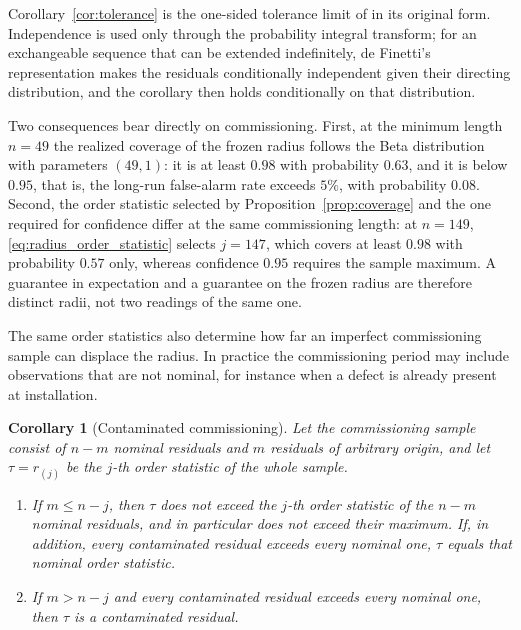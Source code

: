 \documentclass[a4paper]{cas-sc}
\newenvironment{reviewadded}{\par\color{blue}}{\par}
\newtheorem{corollary}{Corollary}
\newcommand{\residual}{\ensuremath{r}}
\begin{document}
\begin{reviewadded}
Corollary~\ref{cor:tolerance} is the one-sided tolerance limit of
\citet{wilks1941} in its original form. Independence is used only through the
probability integral transform; for an exchangeable sequence that can be
extended indefinitely, de Finetti's representation makes the residuals
conditionally independent given their directing distribution, and the
corollary then holds conditionally on that distribution.

Two consequences bear directly on commissioning. First, at the minimum length
\(n=49\) the realized coverage of the frozen radius follows the Beta
distribution with parameters \((49,1)\): it is at least \(0.98\) with
probability \(0.63\), and it is below \(0.95\), that is, the long-run
false-alarm rate exceeds \(5\%\), with probability \(0.08\). Second, the order
statistic selected by Proposition~\ref{prop:coverage} and the one required for
confidence differ at the same commissioning length: at \(n=149\),
\eqref{eq:radius_order_statistic} selects \(j=147\), which covers at least
\(0.98\) with probability \(0.57\) only, whereas confidence \(0.95\) requires
the sample maximum. A guarantee in expectation and a guarantee on the frozen
radius are therefore distinct radii, not two readings of the same one.

The same order statistics also determine how far an imperfect commissioning
sample can displace the radius. In practice the commissioning period may
include observations that are not nominal, for instance when a defect is
already present at installation.

\begin{corollary}[Contaminated commissioning]
\label{cor:contamination}
Let the commissioning sample consist of \(n-m\) nominal residuals and \(m\)
residuals of arbitrary origin, and let \(\tau=\residual_{(j)}\) be the
\(j\)-th order statistic of the whole sample.
\begin{enumerate}[label=(\roman*),leftmargin=1.8em]
\item If \(m\le n-j\), then \(\tau\) does not exceed the \(j\)-th order
      statistic of the \(n-m\) nominal residuals, and in particular does not
      exceed their maximum. If, in addition, every contaminated residual
      exceeds every nominal one, \(\tau\) equals that nominal order statistic.
\item If \(m>n-j\) and every contaminated residual exceeds every nominal one,
      then \(\tau\) is a contaminated residual.
\end{enumerate}
\end{corollary}


\end{reviewadded}
\end{document}

